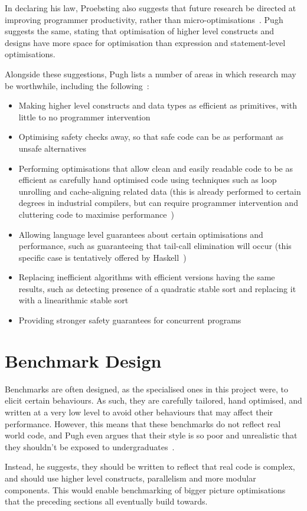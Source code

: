 In declaring his law, Proebsting also suggests that future research be directed at improving programmer productivity, rather than micro-optimisations~\cite{proebstingdecl}. Pugh suggests the same, stating that optimisation of higher level constructs and designs have more space for optimisation than expression and statement-level optimisations.

Alongside these suggestions, Pugh lists a number of areas in which research may be worthwhile, including the following~\cite{optimisationrelevant}:

\begin{itemize}
	\itemsep-0.25em
	\item Making higher level constructs and data types as efficient as primitives, with little to no programmer intervention
	\item Optimising safety checks away, so that safe code can be as performant as unsafe alternatives
	\item Performing optimisations that allow clean and easily readable code to be as efficient as carefully hand optimised code using techniques such as loop unrolling and cache-aligning related data (this is already performed to certain degrees in industrial compilers, but can require programmer intervention and cluttering code to maximise performance~\cite{gccloops})
	\item Allowing language level guarantees about certain optimisations and performance, such as guaranteeing that tail-call elimination will occur (this specific case is tentatively offered by Haskell~\cite{haskelltail})
	\item Replacing inefficient algorithms with efficient versions having the same results, such as detecting presence of a quadratic stable sort and replacing it with a linearithmic stable sort
	\item Providing stronger safety guarantees for concurrent programs
\end{itemize}

\section{Benchmark Design}

Benchmarks are often designed, as the specialised ones in this project were, to elicit certain behaviours. As such, they are carefully tailored, hand optimised, and written at a very low level to avoid other behaviours that may affect their performance. However, this means that these benchmarks do not reflect real world code, and Pugh even argues that their style is so poor and unrealistic that they shouldn't be exposed to undergraduates~\cite{optimisationrelevant}.

Instead, he suggests, they should be written to reflect that real code is complex, and should use higher level constructs, parallelism and more modular components. This would enable benchmarking of bigger picture optimisations that the preceding sections all eventually build towards.

